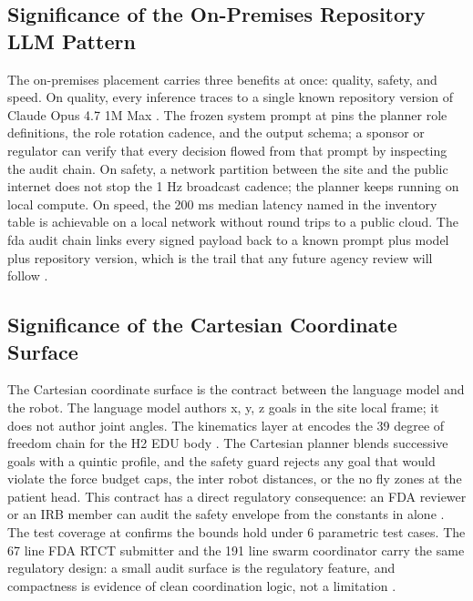 \begin{sectionaccent}
\subsection{Significance of the On-Premises Repository LLM Pattern}
\label{sec:discussion-onprem}

The on-premises placement carries three benefits at once: quality,
safety, and speed. On quality, every inference traces to a single
known repository version of Claude Opus 4.7 1M Max
\cite{anthropic_claude_opus_47_2026}. The frozen system prompt at
 pins the planner role
definitions, the role rotation cadence, and the output schema; a
sponsor or regulator can verify that every decision flowed from
that prompt by inspecting the audit chain. On safety, a network
partition between the site and the public internet does not stop
the 1 Hz broadcast cadence; the planner keeps running on local
compute. On speed, the 200 ms median latency named in the inventory
table is achievable on a local network without round trips to a
public cloud. The fda audit chain links every signed payload back
to a known prompt plus model plus repository version, which is the
trail that any future agency review will follow
\cite{iec_62304, ich_e6r3_2025}.

\subsection{Significance of the Cartesian Coordinate Surface}
\label{sec:discussion-cartesian}

The Cartesian coordinate surface is the contract between the
language model and the robot. The language model authors x, y, z
goals in the site local frame; it does not author joint angles. The
kinematics layer at  encodes
the 39 degree of freedom chain for the H2 EDU body
\cite{unitree_h2_2026}. The Cartesian planner blends successive
goals with a quintic profile, and the safety guard rejects any goal
that would violate the force budget caps, the inter robot distances,
or the no fly zones at the patient head. This contract has a direct
regulatory consequence: an FDA reviewer or an IRB member can audit
the safety envelope from the constants in  alone
\cite{iec_80601_2_77}. The test coverage at
 confirms the bounds
hold under 6 parametric test cases. The 67 line FDA RTCT submitter
and the 191 line swarm coordinator carry the same regulatory design:
a small audit surface is the regulatory feature, and compactness is
evidence of clean coordination logic, not a limitation
\cite{iec_62304}.


\end{sectionaccent}
